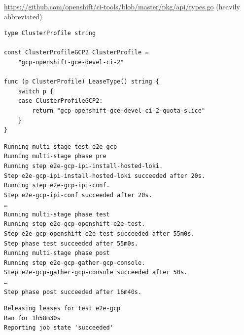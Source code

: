 \begin{frame}[fragile]
    \autotitle
    \url{https://github.com/openshift/ci-tools/blob/master/pkg/api/types.go}
    (heavily abbreviated)
    \footnotesize
    \begin{verbatim}
type ClusterProfile string

const ClusterProfileGCP2 ClusterProfile =
    "gcp-openshift-gce-devel-ci-2"

func (p ClusterProfile) LeaseType() string {
    switch p {
    case ClusterProfileGCP2:
        return "gcp-openshift-gce-devel-ci-2-quota-slice"
    }
}
    \end{verbatim}
\end{frame}

\begin{frame}[fragile]
    \autotitle
    \footnotesize
    \begin{verbatim}
Running multi-stage test e2e-gcp
Running multi-stage phase pre
Running step e2e-gcp-ipi-install-hosted-loki.
Step e2e-gcp-ipi-install-hosted-loki succeeded after 20s.
Running step e2e-gcp-ipi-conf.
Step e2e-gcp-ipi-conf succeeded after 20s.
…
Running multi-stage phase test
Running step e2e-gcp-openshift-e2e-test.
Step e2e-gcp-openshift-e2e-test succeeded after 55m0s.
Step phase test succeeded after 55m0s.
Running multi-stage phase post
Running step e2e-gcp-gather-gcp-console.
Step e2e-gcp-gather-gcp-console succeeded after 50s.
…
Step phase post succeeded after 16m40s.
    \end{verbatim}
\end{frame}

\begin{frame}[fragile]
    \autotitle
    \begin{verbatim}
Releasing leases for test e2e-gcp
Ran for 1h58m30s
Reporting job state 'succeeded'
    \end{verbatim}
\end{frame}
